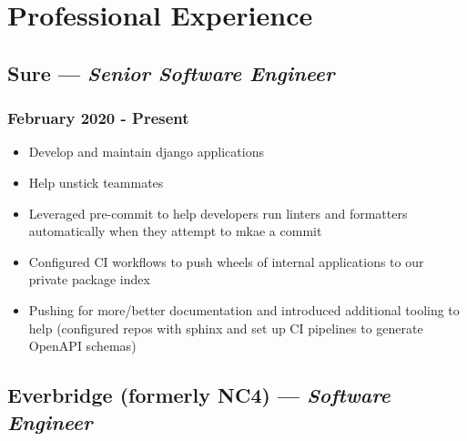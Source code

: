 \documentclass{article}
\begin{document}
\begin{minipage}[t]{.8\textwidth}
\section*{Professional Experience}
\subsection*{Sure  --- \textit{Senior Software Engineer}}
\subsubsection*{February 2020 - Present}
\parbox[t]{.5\textwidth}{\raggedright%
\begin{itemize}
\vspace{-0.5em}
    \item Develop and maintain django applications
    \item Help unstick teammates
    \item Leveraged pre-commit to help developers run linters and formatters automatically when they attempt to mkae a commit
    \item Configured CI workflows to push wheels of internal applications to our private package index
\end{itemize}}
\parbox[t]{.5\textwidth}{\raggedright%
\begin{itemize}
\vspace{-1.5em}
    \item Pushing for more/better documentation and introduced additional tooling to help (configured repos with sphinx and set up CI pipelines to generate OpenAPI schemas)
\end{itemize}}
\vspace{-1.5em}
\subsection*{Everbridge (formerly NC4) --- \textit{Software Engineer}}

\end{minipage}
\end{document}
